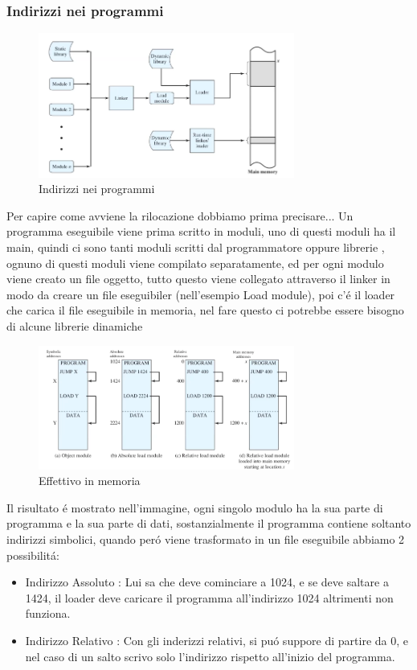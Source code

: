     \subsubsection*{Indirizzi nei programmi}
    \begin{figure}[H]
        \centering
        \includegraphics[width=0.75\textwidth]{immagini/Indirizzi nei programmi}
        \caption{Indirizzi nei programmi}
    \end{figure}
    Per capire come avviene la rilocazione dobbiamo prima precisare... Un programma eseguibile viene prima scritto
    in moduli, uno di questi moduli ha il main, quindi ci sono tanti moduli scritti dal programmatore oppure librerie
    , ognuno di questi moduli viene compilato separatamente, ed per ogni modulo viene creato un file oggetto, tutto
    questo viene collegato attraverso il linker in modo da creare un file eseguibiler (nell'esempio Load module),
    poi c'é il loader che carica il file eseguibile in memoria, nel fare questo ci potrebbe essere bisogno di alcune librerie dinamiche
    \begin{figure}[H]
        \centering
        \includegraphics[width=0.75\textwidth]{immagini/IndirizziInMemoria}
        \caption{Effettivo in memoria}
    \end{figure}
    Il risultato é mostrato nell'immagine, ogni singolo modulo ha la sua parte di programma e la sua parte di dati,
    sostanzialmente il programma contiene soltanto indirizzi simbolici, quando peró viene trasformato in un file eseguibile
    abbiamo 2 possibilitá:
    \begin{itemize}
        \item Indirizzo Assoluto : Lui sa che deve cominciare a 1024, e se deve saltare a 1424, il loader deve caricare il programma all'indirizzo 1024 altrimenti non funziona.
        \item Indirizzo Relativo : Con gli inderizzi relativi, si puó suppore di partire da 0, e nel caso di un salto scrivo solo l'indirizzo rispetto all'inizio del programma.
    \end{itemize}
